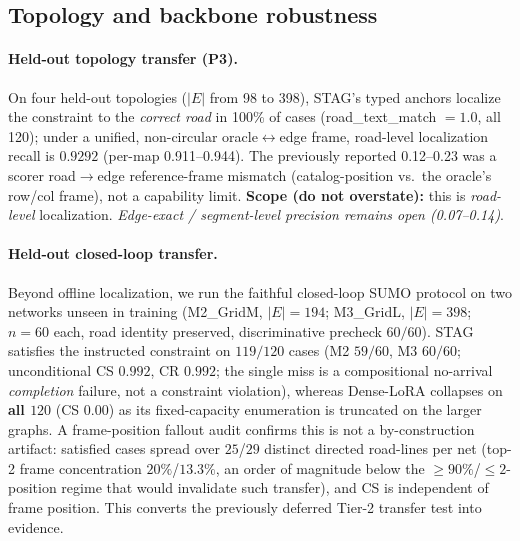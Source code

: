 \subsection{Topology and backbone robustness}
\label{sec:robustness}

\paragraph{Held-out topology transfer (P3).}
On four held-out topologies ($|E|$ from 98 to 398), STAG's typed anchors localize the constraint to the
\emph{correct road} in 100\% of cases (road\_text\_match $=1.0$, all 120); under a unified, non-circular
oracle$\leftrightarrow$edge frame, road-level localization recall is $\mathbf{0.9292}$ (per-map
0.911--0.944). The previously reported 0.12--0.23 was a scorer road$\to$edge reference-frame mismatch
(catalog-position vs.\ the oracle's row/col frame), not a capability limit. \textbf{Scope (do not
overstate):} this is \emph{road-level} localization. \emph{Edge-exact / segment-level precision remains
open (0.07--0.14)}.

\paragraph{Held-out closed-loop transfer.}
Beyond offline localization, we run the faithful closed-loop SUMO protocol on two networks unseen in
training (M2\_GridM, $|E|{=}194$; M3\_GridL, $|E|{=}398$; $n{=}60$ each, road identity preserved,
discriminative precheck $60/60$). STAG satisfies the instructed constraint on \textbf{$119/120$} cases
(M2 $59/60$, M3 $60/60$; unconditional CS $0.992$, CR $0.992$; the single miss is a compositional
no-arrival \emph{completion} failure, not a constraint violation), whereas Dense-LoRA collapses on
\textbf{all $120$} (CS $0.00$) as its fixed-capacity enumeration is truncated on the larger graphs. A
frame-position fallout audit confirms this is not a by-construction artifact: satisfied cases spread over
$25$/$29$ distinct directed road-lines per net (top-2 frame concentration $20\%$/$13.3\%$, an order of
magnitude below the $\ge 90\%$/$\le 2$-position regime that would invalidate such transfer), and CS is
independent of frame position. This converts the previously deferred Tier-2 transfer test into evidence.

